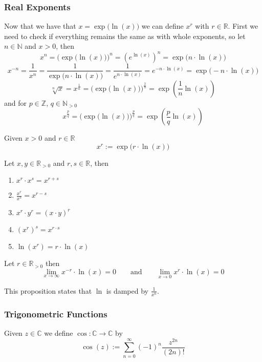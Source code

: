 \subsubsection{Real Exponents}
Now that we have that \(x = \exp\big(\ln(x)\big)\) we can define \(x^r\) with \(r \in \mathbb{R}\).
First we need to check if everything remains the same as with whole exponents, so let \(n \in \mathbb{N}\) and \(x > 0\), then
\[x^n = \Big(\exp\big(\ln(x)\big)\Big)^n = \left(e^{\ln(x)}\right)^n = \exp\big(n \cdot \ln(x)\big)\]
\[x^{-n} = \frac{1}{x^n} = \frac{1}{\exp\big(n \cdot \ln(x)\big)} = \frac{1}{e^{n \cdot \ln(x)}} = e^{-n \cdot \ln(x)} = \exp\big(-n \cdot \ln(x)\big)\]
\[\sqrt[n]{x} = x^{\frac{1}{n}} = \Big(\exp\big(\ln(x)\big)\Big)^\frac{1}{n} = \exp\left(\frac{1}{n} \ln(x)\right)\]
and for \(p \in \mathbb{Z}\), \(q \in \mathbb{N}_{>0}\)
\[x^\frac{p}{q} = \Big(\exp\big(\ln(x)\big)\Big)^\frac{p}{q} = \exp\left(\frac{p}{q} \ln(x)\right)\]

\begin{definition}
   Given \(x > 0\) and \(r \in \mathbb{R}\)
   \[x^r := \exp\big(r \cdot \ln(x)\big)\]
\end{definition}

\begin{proposition}
   Let \(x, y \in \mathbb{R}_{>0}\) and \(r, s \in \mathbb{R}\), then
   \begin{enumerate}[label=\roman*, align=Center]
      \item \(x^r \cdot x^s = x^{r + s}\)
      \item \(\frac{x^r}{x^s} = x^{r-s}\)
      \item \(x^r \cdot y^r = (x \cdot y)^r\)
      \item \((x^r)^s = x^{r \cdot s}\)
      \item \(\ln(x^r) = r \cdot \ln(x)\)
   \end{enumerate}
\end{proposition}

\begin{proposition}
   Let \(r \in \mathbb{R}_{>0}\) then
   \[\lim_{x \to \infty} x^{-r} \cdot \ln(x) = 0 \qquad\text{and}\qquad \lim_{x \to 0} x^r \cdot \ln(x) = 0\]
\end{proposition}
\begin{remark}
   This proposition states that \(\ln\) is damped by \(\frac{1}{x^n}\).
\end{remark}

\subsubsection{Trigonometric Functions}
\begin{definition}[Cosine]
   Given \(z \in \mathbb{C}\) we define \(\cos: \mathbb{C} \to \mathbb{C}\) by
   \[\cos(z) := \sum_{n=0}^\infty (-1)^n \frac{z^{2n}}{(2n)!}\]
\end{definition}

